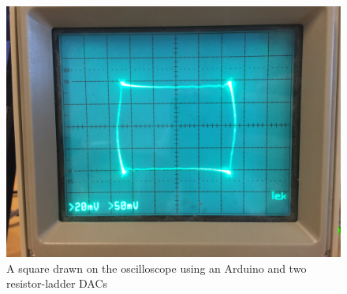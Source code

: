 \begin{figure}[h]
\includegraphics[width=\columnwidth]{images/osc_square_close}
\centering
\caption{A square drawn on the oscilloscope using an Arduino and two resistor-ladder DACs}
\label{fig:osc_poc}
\end{figure}